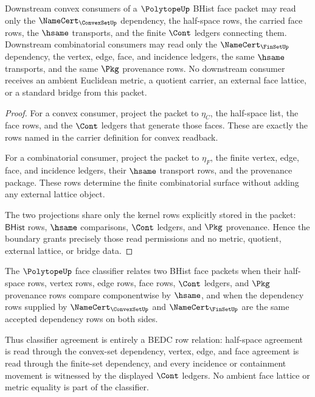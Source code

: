 \begin{theorem}
\label{thm:polytope-downstream-boundary}
Downstream convex consumers of a $\PolytopeUp$ BHist face packet may read only
the $\NameCert_{\ConvexSetUp}$ dependency, the half-space rows, the carried
face rows, the $\hsame$ transports, and the finite $\Cont$ ledgers connecting
them. Downstream combinatorial consumers may read only the
$\NameCert_{\FinSetUp}$ dependency, the vertex, edge, face, and incidence
ledgers, the same $\hsame$ transports, and the same $\Pkg$ provenance rows. No
downstream consumer receives an ambient Euclidean metric, a quotient carrier,
an external face lattice, or a standard bridge from this packet.
\end{theorem}
\begin{proof}
For a convex consumer, project the packet to $\eta_C$, the half-space list, the
face rows, and the $\Cont$ ledgers that generate those faces. These are exactly
the rows named in the carrier definition for convex readback.

For a combinatorial consumer, project the packet to $\eta_F$, the finite
vertex, edge, face, and incidence ledgers, their $\hsame$ transport rows, and
the provenance package. These rows determine the finite combinatorial surface
without adding any external lattice object.

The two projections share only the kernel rows explicitly stored in the packet:
$\mathsf{BHist}$ rows, $\hsame$ comparisons, $\Cont$ ledgers, and $\Pkg$
provenance. Hence the boundary grants precisely those read permissions and no
metric, quotient, external lattice, or bridge data.
\end{proof}

\begin{definition}
\label{def:polytope-face-classifier}
The $\PolytopeUp$ face classifier relates two BHist face packets when their
half-space rows, vertex rows, edge rows, face rows, $\Cont$ ledgers, and $\Pkg$
provenance rows compare componentwise by $\hsame$, and when the dependency
rows supplied by $\NameCert_{\ConvexSetUp}$ and $\NameCert_{\FinSetUp}$ are the
same accepted dependency rows on both sides.

Thus classifier agreement is entirely a BEDC row relation: half-space
agreement is read through the convex-set dependency, vertex, edge, and face
agreement is read through the finite-set dependency, and every incidence or
containment movement is witnessed by the displayed $\Cont$ ledgers. No ambient
face lattice or metric equality is part of the classifier.
\end{definition}

